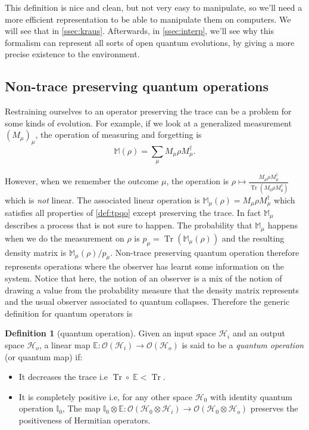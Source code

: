 \documentclass[10pt,a4paper]{report}
\theoremstyle{plain}
\theoremstyle{definition}
\newtheorem{defn}{Definition}[chapter]
\theoremstyle{remark}
\DeclareMathOperator{\Tr}{Tr}
\begin{document}
This definition is nice and clean, but not very easy to manipulate, so we'll
need a more efficient representation to be able to manipulate them on computers.
We will see that in \cref{ssec:kraus}. Afterwards, in \cref{ssec:interp}, we'll see
why this formalism can represent all sorts of open quantum evolutions, by giving
a more precise existence to the environment.

\subsection{Non-trace preserving quantum operations}

Restraining ourselves to an operator preserving the trace can be a problem for
some kinds of evolution. For example, if we look at a generalized measurement
${(M_\mu)}_\mu$, the operation of measuring and forgetting is
\[\mathbb{M}(\rho) = \sum_\mu M_\mu \rho M_\mu^\dagger.\]

However, when we remember the outcome $\mu$, the operation is $\rho \mapsto
\frac{M_\mu \rho M_\mu^\dagger}{\Tr(M_0\rho M_0^\dagger)}$ which is \emph{not}
linear. The associated linear operation is $\mathbb{M}_\mu(\rho) = M_\mu\rho
M_\mu^\dagger$ which satisfies all properties of \cref{def:tpqo} except preserving
the trace. In fact $\mathbb{M}_\mu$ describes a process that is not sure to
happen. The probability that $\mathbb{M}_\mu$ happens when we do the measurement
on $\rho$ is $p_\mu = \Tr(\mathbb{M}_\mu(\rho))$ and the resulting density matrix is
$\mathbb{M}_\mu(\rho)/p_\mu$.
Non-trace preserving quantum operation therefore represents
operations where the observer has learnt some information on the system. Notice
that here, the notion of an observer is a mix of the notion of drawing a value from
the probability measure that the density matrix represents and the usual observer
associated to quantum collapses. Therefore the generic definition for quantum
operators is
\begin{defn}[quantum operation]\label{def:qo}
  Given an input space $\mathcal{H}_i$ and an output space $\mathcal{H}_o$, a
  linear map $\mathbb E : \mathcal{O}(\mathcal{H}_i) \to
  \mathcal{O}(\mathcal{H}_o)$ is said to be a \emph{quantum
    operation} (or quantum map) if:
  \begin{itemize}
  \item It decreases the trace i.e $\Tr \circ\; \mathbb E < \Tr$.
  \item It is completely positive i.e, for any other space $\mathcal{H}_0$ with
    identity quantum operation $\mathbb I_0$, The map $\mathbb I_0 \otimes
    \mathbb E : \mathcal{O}(\mathcal{H}_0 \otimes \mathcal{H}_i) \to
    \mathcal{O}(\mathcal{H}_0 \otimes \mathcal{H}_o)$ preserves the positiveness
    of Hermitian operators.
  \end{itemize}
\end{defn}
\end{document}
